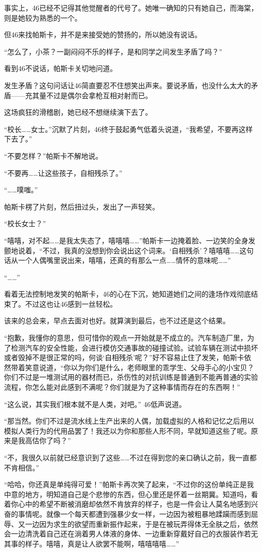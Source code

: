 事实上，46已经不记得其他觉醒者的代号了。她唯一确知的只有她自己，而海棠，则是她较为熟悉的一个。

但46来找帕斯卡，并不是来接受她的赞扬的，所以她没有说话。

“怎么了，小茶？一副闷闷不乐的样子，是和同学之间发生矛盾了吗？”

看到46不说话，帕斯卡关切地问道。

发生矛盾？这句问话让46简直要忍不住想笑出声来。要说矛盾，也没什么太大的矛盾——充其量不过是偶尔会拿枪互相对射而已。

这场疯狂的滑稽剧，她已经不想继续演下去了。

“校长……女士。”沉默了片刻，46终于鼓起勇气低着头说道，“我希望，不要再这样下去了。”

“不要怎样？”帕斯卡不解地说。

“不要再……让这些孩子，自相残杀了。”

“……噗嗤。”

帕斯卡楞了片刻，然后扭过头，发出了一声轻笑。

“校长女士？”

“嘻嘻，对不起……是我太失态了，嘻嘻嘻……”帕斯卡一边掩着脸、一边笑的全身发颤地说着，“不过，我真的没想到你会说出这个词来。‘自相残杀’？嘻嘻嘻……这句话从一个人偶嘴里说出来，嘻嘻，还真的有那么一点……情怀的意味呢……”

“……”

看着无法控制地发笑的帕斯卡，46的心在下沉，她知道她们之间的逢场作戏彻底结束了。不过这也让46感到一丝轻松。

该来的总会来，早点去面对也好。就算演到最后，也不过还是这个结果。

“抱歉，我懂你的意思，但可惜你的观点一开始就是不成立的。汽车制造厂里，为了检测汽车的安全性能，会进行模仿交通事故的碰撞试验。试验车辆在测试中损坏或者毁掉不是很正常的吗，何谈‘自相残杀’呢？”好不容易止住了发笑，帕斯卡依然带着笑意说道，“你以为你们是什么，老师眼里的乖学生、父母手心的小宝贝？你们不过是一堆测试用的器材而已，杀伤性的对抗训练是普通到不能再普通的实验流程，你怎么能对此感到不满呢？你们就是为了这种事情而存在的东西啊！”

“这么说，其实我们根本就不是人类，对吧。” 46低声说道。

“那当然。你们不过是流水线上生产出来的人偶，加载虚拟的人格和记忆之后用以模拟人类行为的代用品罢了！我还以为你和那些人形不同，早就知道这些了呢。原来是我高估你了吗？”

“不，我很久以前就已经意识到了这些……不过在得到您的亲口确认之前，我一直都不肯相信。” 

“哈哈，你还真是单纯得可爱！”帕斯卡再次笑了起来，“不过你的这份单纯正是我中意的地方，明知道自己是个悲惨的东西，但心里还是怀着一丝期冀。知道吗，看着你心中的希望不断被消磨却依然不肯放弃的样子，也是一件会让人莫名地感到兴奋的事情呢。就像一个每天都遭到强暴少女一样，一边因为被粗暴地蹂躏而感到屈辱、又一边因为求生的欲望而重新振作起来，于是在被玩弄得体无全肤之后，依然会一边清洗着自己还在淌着男人体液的身体、一边重新穿戴好自己的衣服装作若无其事的样子。嘻嘻，真是让人欲罢不能啊，嘻嘻嘻嘻……”

